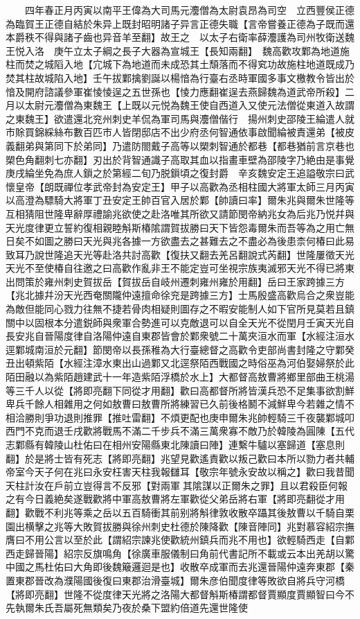 　　四年春正月丙寅以南平王偉為大司馬元灋僧為太尉袁昂為司空　立西豐侯正德為臨賀王正德自結於朱异上既封昭明諸子异言正德失職【言帝嘗養正德為子既而還本爵秩不得與諸子齒也异音羊至翻】故王之　以太子右衛率薛灋護為司州牧衛送魏王悦入洛　庚午立太子綱之長子大器為宣城王【長知兩翻】　魏高歡攻鄴為地道施柱而焚之城䧟入地【宂城下為地道而未成恐其土頹落而不得䆒功故施柱地道既成乃焚其柱故城陷入地】壬午拔鄴擒劉誕以楊愔為行臺右丞時軍國多事文檄教令皆出於愔及開府諮議參軍崔㥄㥄逞之五世孫也【㥄力應翻崔逞去燕歸魏為道武帝所殺】二月以太尉元灋僧為東魏王【上既以元悦為魏王使自西道入又使元法僧從東道入故謂之東魏王】欲遣還北兖州刺史羊侃為軍司馬與灋僧偕行　揚州刺史邵陵王綸遣人就市賖買錦綵絲布數百匹市人皆閉邸店不出少府丞何智通依事啟聞綸被責還弟【被皮義翻弟與第同下於弟同】乃遣防閤戴子高等以槊刺智通於都巷【都巷猶前言京巷也槊色角翻刺七亦翻】刃出於背智通識子高取其血以指畫車壁為邵陵字乃絶由是事覺庚戌綸坐免為庶人鎻之於第經二旬乃脱鎻頃之復封爵　辛亥魏安定王追謚敬宗曰武懷皇帝【朗既禪位孝武帝封為安定王】甲子以高歡為丞相柱國大將軍太師三月丙寅以高澄為驃騎大將軍丁丑安定王帥百官入居於鄴【帥讀曰率】爾朱兆與爾朱世隆等互相猜阻世隆卑辭厚禮諭兆欲使之赴洛唯其所欲又請節閔帝納兆女為后兆乃悦幷與天光度律更立誓約復相親睦斛斯椿隂謂賀拔勝曰天下皆怨毒爾朱而吾等為之用亡無日矣不如圖之勝曰天光與兆各據一方欲盡去之甚難去之不盡必為後患柰何椿曰此易致耳乃說世隆追天光等赴洛共討高歡【復扶又翻去羌呂翻說式芮翻】世隆屢徵天光天光不至使椿自往邀之曰高歡作亂非王不能定豈可坐視宗族夷滅邪天光不得已將東出問策於雍州刺史賀拔岳【賀拔岳自岐州遷刺雍州雍於用翻】岳曰王家跨據三方【兆北據幷汾天光西奄關隴仲遠擅命徐兖是跨據三方】士馬殷盛高歡烏合之衆豈能為敵但能同心戮力往無不捷若骨肉相疑則圖存之不暇安能制人如下官所見莫若且鎮關中以固根本分遣鋭師與衆軍合勢進可以克敵退可以自全天光不從閏月壬寅天光自長安兆自晉陽度律自洛陽仲遠自東郡皆會於鄴衆號二十萬夾洹水而軍【水經注洹水逕鄴城南洹於元翻】節閔帝以長孫稚為大行臺總督之高歡令吏部尚書封隆之守鄴癸丑出頓紫陌【水經注漳水東出山過鄴又北逕祭陌西戰國之時俗巫為河伯娶婦祭於此陌田融以為紫陌趙建武十一年造紫陌浮橋於水上】大都督高敖曹將鄉里部曲王桃湯等三千人以從【將即亮翻下同從才用翻】歡曰高都督所將皆漢兵恐不足集事欲割鮮卑兵千餘人相雜用之何如敖曹曰敖曹所將練習已久前後格鬭不減鮮卑今若雜之情不相洽勝則爭功退則推罪【推吐雷翻】不煩更配也庚申爾朱兆帥輕騎三千夜襲鄴城叩西門不克而退壬戌歡將戰馬不滿二千步兵不滿三萬衆寡不敵乃於韓陵為圓陳【五代志鄴縣有韓陵山杜佑曰在相州安陽縣東北陳讀曰陣】連繫牛驢以塞歸道【塞息則翻】於是將士皆有死志【將即亮翻】兆望見歡遙責歡以叛己歡曰本所以勠力者共輔帝室今天子何在兆曰永安枉害天柱我報讎耳【敬宗年號永安故以稱之】歡曰我昔聞天柱計汝在戶前立豈得言不反邪【對兩軍其隂謀以正爾朱之罪】且以君殺臣何報之有今日義絶矣遂戰歡將中軍高敖曹將左軍歡從父弟岳將右軍【將即亮翻從才用翻】歡戰不利兆等乘之岳以五百騎衝其前别將斛律敦收散卒躡其後敖曹以千騎自栗園出横擊之兆等大敗賀拔勝與徐州刺史杜德於陳降歡【陳音陣同】兆對慕容紹宗撫膺曰不用公言以至於此【謂紹宗諫兆使歡統州鎮兵而兆不用也】欲輕騎西走【自鄴西走歸晉陽】紹宗反旗鳴角【徐廣車服儀制曰角前代書記所不載或云本出羌胡以驚中國之馬杜佑曰大角即後魏簸邏迴是也】收散卒成軍而去兆還晉陽仲遠奔東郡【秦置東郡晉改為濮陽國後復曰東郡治滑臺城】爾朱彦伯聞度律等敗欲自將兵守河橋【將即亮翻】世隆不從度律天光將之洛陽大都督斛斯椿謂都督賈顯度賈顯智曰今不先執爾朱氏吾屬死無類矣乃夜於桑下盟約倍道先還世隆使